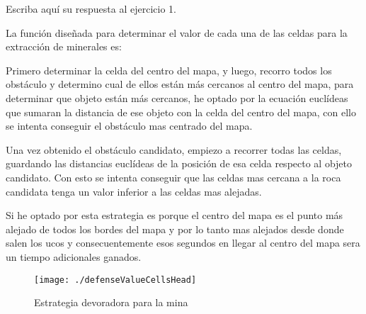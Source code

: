Escriba aquí su respuesta al ejercicio 1. 

La función diseñada para determinar el valor de cada una de las celdas para la extracción de minerales es:

Primero determinar la celda del centro del mapa, y luego, recorro todos los obstáculo y determino cual de ellos están más cercanos al centro del mapa, para determinar que objeto están más cercanos, he optado por la ecuación euclídeas que sumaran la distancia de ese objeto con la celda del centro del mapa, con ello se intenta conseguir el obstáculo mas centrado del mapa.

Una vez obtenido el obstáculo candidato, empiezo a recorrer todas las celdas, guardando las distancias euclídeas de la posición de esa celda respecto al objeto candidato. Con esto se intenta conseguir que las celdas mas cercana a la roca candidata tenga un valor inferior a las celdas mas alejadas.

Si he optado por esta estrategia es porque el centro del mapa es el punto más alejado de todos los bordes del mapa y por lo tanto mas alejados desde donde salen los ucos y consecuentemente esos segundos en llegar al centro del mapa sera un tiempo adicionales ganados.

\begin{figure}
\centering
\texttt{[image: ./defenseValueCellsHead]} %
\caption{Estrategia devoradora para la mina}
\label{fig:defenseValueCellsHead}
\end{figure}





